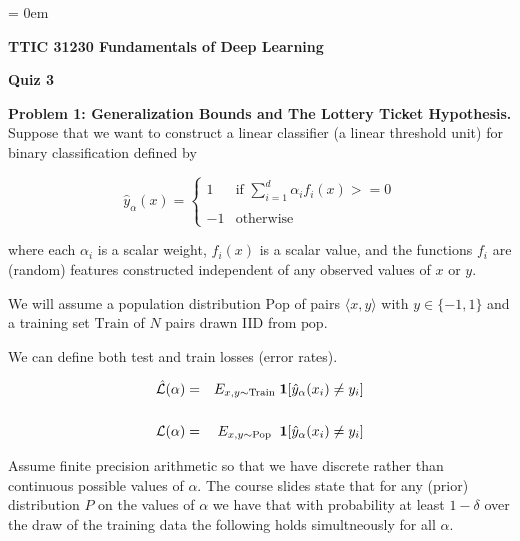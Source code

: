 

%

\usepackage{amsmath,amssymb,amsthm,graphicx,color}
\newcommand{\pop}{\mathrm{Pop}}
\newcommand{\train}{\mathrm{Train}}
\DeclareMathOperator*{\argmin}{argmin}
\DeclareMathOperator*{\argmax}{argmax}
\newcommand{\tuple}[1]{{\mbox{$\langle#1\rangle$}}}

\parindent = 0em

\newcommand{\solution}[1]{\bigskip {\color{red} {\bf Solution:} #1}}




\centerline{\bf TTIC 31230 Fundamentals of Deep Learning}
\centerline{\bf Quiz 3}

\bigskip
    {\bf Problem 1: Generalization Bounds and The Lottery Ticket Hypothesis.}  Suppose that we want to construct a linear classifier (a linear threshold unit) for binary classification defined by

    $$\hat{y}_\alpha(x) = \left\{\begin{array}{ll} 1 & \mbox{if $\sum_{i = 1}^d \alpha_i f_i(x) >= 0$} \\ \\ -1 & \mbox{otherwise}\end{array}\right.$$

    where each $\alpha_i$ is a scalar weight, $f_i(x)$ is a scalar value, and the functions $f_i$ are (random) features constructed independent of any observed values of $x$ or $y$.

    We will assume a population distribution $\pop$ of pairs $\tuple{x,y}$ with $y \in \{-1,1\}$ and a training set $\mathrm{Train}$ of $N$ pairs drawn IID from $\mathrm{pop}$.

    We can define both test and train losses (error rates).

    \begin{eqnarray*}
      \hat{\cal L}(\alpha) & = & E_{{x,y} \sim \train}\;\mathbf{1}[\hat{y}_\alpha(x_i) \neq y_i] \\
      \\
      {\cal L}(\alpha) & = & E_{{x,y} \sim \pop}\;\;\mathbf{1}[\hat{y}_\alpha(x_i) \not = y_i] \\
    \end{eqnarray*}

    Assume finite precision arithmetic so that we have discrete rather than continuous possible values of $\alpha$.
    The course slides state that for any (prior) distribution $P$ on the values of $\alpha$ we have that with probability at least $1-\delta$
    over the draw of the training data the following holds simultneously for all $\alpha$.

